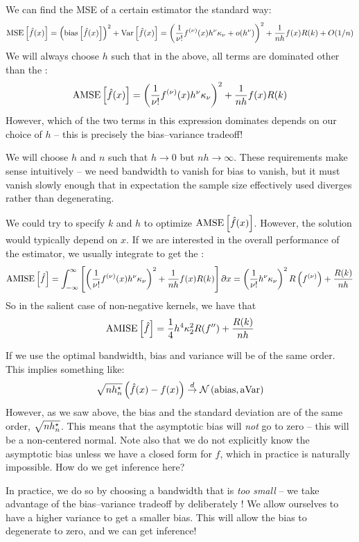 \documentclass[10pt]{article}
\begin{document}
We can find the MSE of a certain estimator the standard way:
\[
\mathop{\rm MSE}\left[ \hat{f}(x)\right] = \left( \mathop{\rm bias} \left[ \hat{f}(x)\right]\right)^2 + \mathop{\rm Var}\left[ \hat{f}(x)\right] = \left( \frac{1}{\nu!}f^{(\nu)}(x)h^\nu\kappa_\nu +  o(h^\nu)\right)^2 +  \frac{1}{nh}f(x)R(k) + O(1/n)
\]
We will always choose $h$ such that in the above, all terms are dominated other than the :
\[
\text{AMSE}\left[ \hat{f}(x)\right] = \left( \frac{1}{\nu!}f^{(\nu)}(x)h^\nu\kappa_\nu\right)^2 + \frac{1}{nh}f(x)R(k)\]However, which of the two terms in this expression dominates depends on our choice of $h$ -- this is precisely the bias--variance tradeoff! 

We will choose $h$ and $n$ such that $h \to 0$ but $nh \to \infty$. These requirements make sense intuitively -- we need bandwidth to vanish for bias to vanish, but it must vanish slowly enough that in expectation the sample size effectively used diverges rather than degenerating.

\begin{remark}
	We could try to specify $k$ and $h$ to optimize $\text{AMSE}\left[ \hat{f}(x)\right]$. However, the solution would typically depend on $x$. If we are interested in the overall performance of the estimator, we usually integrate to get the :
	\[
	\text{AMISE}\left[ \hat{f}\right] = \int_{-\infty}^\infty \left[ \left( \frac{1}{\nu!}f^{(\nu)}(x)h^\nu\kappa_\nu\right)^2 + \frac{1}{nh}f(x)R(k)\right]\partial x = \left( \frac{1}{\nu!}h^\nu \kappa_\nu\right)^2 R\left( f^{(\nu)}\right) + \frac{R(k)}{nh}
	\]
	So in the salient case of non-negative kernels, we have that \[\text{AMISE} \left[ \hat{f}\right] = \frac{1}{4} h^4 \kappa_2^2R(f'')+ \frac{R(k)}{nh}\]
\end{remark}


\begin{remark}
	If we use the optimal bandwidth, bias and variance will be of the same order. This implies something like:\[\sqrt{nh^\star_n}\left( \hat{f}(x)-f(x)\right) \overset{d}{\to} \mathcal{N}\left( \text{abias},\text{aVar}\right)\]However, as we saw above, the bias and the standard deviation are of the same order, $\sqrt{nh^\star_n}$. This means that the asymptotic bias will \emph{not} go to zero -- this will be a non-centered normal. Note also that we do not explicitly know the asymptotic bias unless we have a closed form for $f$, which in practice is naturally impossible. How do we get inference here?
\end{remark}

In practice, we do so by choosing a bandwidth that is \emph{too small} -- we take advantage of the bias--variance tradeoff by deliberately ! We allow ourselves to have a higher variance to get a smaller bias. This will allow the bias to degenerate to zero, and we can get inference!
\end{document}
